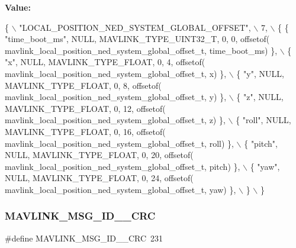 {\bfseries Value\+:}
\begin{DoxyCode}
\{ \(\backslash\)
    \textcolor{stringliteral}{"LOCAL\_POSITION\_NED\_SYSTEM\_GLOBAL\_OFFSET"}, \(\backslash\)
    7, \(\backslash\)
    \{  \{ \textcolor{stringliteral}{"time\_boot\_ms"}, NULL, MAVLINK_TYPE_UINT32_T, 0, 0, offsetof(
      mavlink_local_position_ned_system_global_offset_t, time\_boot\_ms) \}, \(\backslash\)
         \{ \textcolor{stringliteral}{"x"}, NULL, MAVLINK_TYPE_FLOAT, 0, 4, offsetof(
      mavlink_local_position_ned_system_global_offset_t, x) \}, \(\backslash\)
         \{ \textcolor{stringliteral}{"y"}, NULL, MAVLINK_TYPE_FLOAT, 0, 8, offsetof(
      mavlink_local_position_ned_system_global_offset_t, y) \}, \(\backslash\)
         \{ \textcolor{stringliteral}{"z"}, NULL, MAVLINK_TYPE_FLOAT, 0, 12, offsetof(
      mavlink_local_position_ned_system_global_offset_t, z) \}, \(\backslash\)
         \{ \textcolor{stringliteral}{"roll"}, NULL, MAVLINK_TYPE_FLOAT, 0, 16, offsetof(
      mavlink_local_position_ned_system_global_offset_t, roll) \}, \(\backslash\)
         \{ \textcolor{stringliteral}{"pitch"}, NULL, MAVLINK_TYPE_FLOAT, 0, 20, offsetof(
      mavlink_local_position_ned_system_global_offset_t, pitch) \}, \(\backslash\)
         \{ \textcolor{stringliteral}{"yaw"}, NULL, MAVLINK_TYPE_FLOAT, 0, 24, offsetof(
      mavlink_local_position_ned_system_global_offset_t, yaw) \}, \(\backslash\)
         \} \(\backslash\)
\}
\end{DoxyCode}
\mbox{\label{mavlink__msg__local__position__ned__system__global__offset_8h_a34fe95bde9bfb09cb36d3f9c4430ccf6}} 
\subsubsection{M\+A\+V\+L\+I\+N\+K\+\_\+\+M\+S\+G\+\_\+\+I\+D\+\_\+\_\+\+C\+RC}
{\footnotesize\ttfamily \#define M\+A\+V\+L\+I\+N\+K\+\_\+\+M\+S\+G\+\_\+\+I\+D\+\_\+\_\+\+C\+RC~231}

